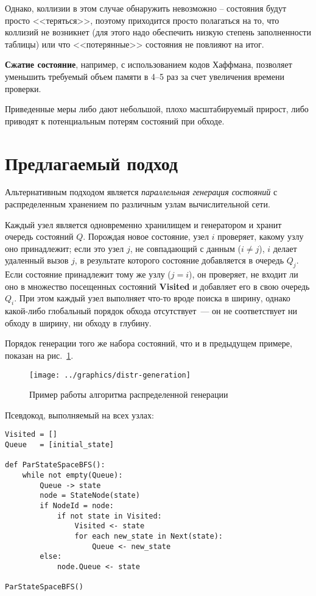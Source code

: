 \documentclass[12pt,a4paper,fleqn]{article}
\newcommand{\Code}[1]{\textbf{\mbox{#1}}}
\begin{document}
Однако, коллизии в этом случае обнаружить невозможно -- состояния будут просто
<<теряться>>, поэтому приходится просто полагаться на то, что коллизий не возникнет (для
этого надо обеспечить низкую степень заполненности таблицы) или что <<потерянные>>
состояния не повлияют на итог.

\textbf{Сжатие состояние}, например, с использованием кодов Хаффмана, позволяет уменьшить требуемый
объем памяти в 4--5 раз за счет увеличения времени проверки.

Приведенные меры либо дают небольшой, плохо масштабируемый прирост, либо приводят к потенциальным потерям
состояний при обходе.

\section{Предлагаемый подход}

Альтернативным подходом является \emph{параллельная генерация состояний} с распределенным хранением
по различным узлам вычислительной сети.

Каждый узел является одновременно хранилищем и генератором и хранит очередь состояний
$Q$. Порождая новое состояние, узел $i$ проверяет, какому узлу оно принадлежит; если это
узел $j$, не совпадающий с данным ($i \neq j$), $i$ делает удаленный вызов $j$, в
результате которого состояние добавляется в очередь $Q_j$. Если состояние принадлежит тому
же узлу ($j = i$), он проверяет, не входит ли оно в множество посещенных состояний
\Code{Visited} и добавляет его в свою очередь $Q_i$. При этом каждый узел выполняет что-то
вроде поиска в ширину, однако какой-либо глобальный порядок обхода отсутствует~--- он не
соответствует ни обходу в ширину, ни обходу в глубину.

Порядок генерации того же набора состояний, что и в предыдущем примере, показан на
рис.~\ref{fig:distr-generation}.

\begin{figure}[!htb]
  \centering
  \texttt{[image: ../graphics/distr-generation]}
  \caption{Пример работы алгоритма распределенной генерации}
  \label{fig:distr-generation}
\end{figure}

Псевдокод, выполняемый на всех узлах:

\begin{lstlisting}[style=pseudocode]
Visited = []
Queue   = [initial_state]

def ParStateSpaceBFS():
    while not empty(Queue):
        Queue -> state
        node = StateNode(state)
        if NodeId = node:
            if not state in Visited:
                Visited <- state
                for each new_state in Next(state):
                    Queue <- new_state
        else:
            node.Queue <- state

ParStateSpaceBFS()
\end{lstlisting}
\end{document}
